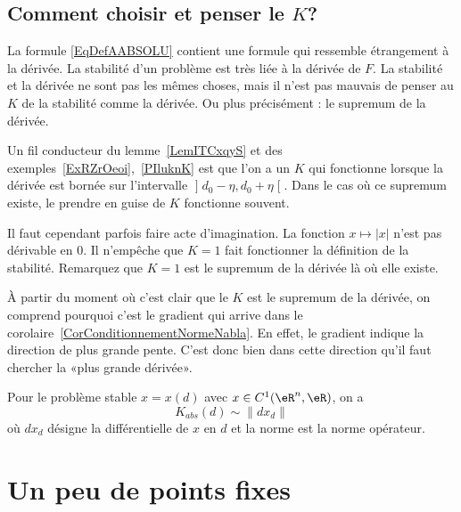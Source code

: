 \subsection{Comment choisir et penser le $K$?}

La formule \eqref{EqDefAABSOLU} contient une formule qui ressemble étrangement à la dérivée. La stabilité d'un problème est très liée à la dérivée de $F$. La stabilité et la dérivée ne sont pas les mêmes choses, mais il n'est pas mauvais de penser au $K$ de la stabilité comme la dérivée. Ou plus précisément : le supremum de la dérivée.

Un fil conducteur du lemme~\ref{LemITCxqyS} et des exemples~\ref{ExRZrOeoi},~\ref{PIluknK} est que l'on a un $K$ qui fonctionne lorsque la dérivée est bornée sur l'intervalle $\mathopen] d_0-\eta , d_0+\eta \mathclose[$. Dans le cas où ce supremum existe, le prendre en guise de $K$ fonctionne souvent.

Il faut cependant parfois faire acte d'imagination. La fonction $x\mapsto| x |$ n'est pas dérivable en $0$. Il n'empêche que $K=1$ fait fonctionner la définition de la stabilité. Remarquez que $K=1$ est le supremum de la dérivée là où elle existe.

À partir du moment où c'est clair que le $K$ est le supremum de la dérivée, on comprend pourquoi c'est le gradient qui arrive dans le corolaire~\ref{CorConditionnementNormeNabla}. En effet, le gradient indique la direction de plus grande pente. C'est donc bien dans cette direction qu'il faut chercher la «plus grande dérivée».

\begin{proposition}
	Pour le problème stable $x=x(d)$ avec $x\in C^1(\eR^n,\eR)$, on a
	\begin{equation}
		K_{abs}(d)\sim\| dx_d \|
	\end{equation}
	où \( dx_d\) désigne la différentielle de $x$ en $d$ et la norme est la norme opérateur.
\end{proposition}

\section{Un peu de points fixes}
\label{SECooWUVTooMhmvaW}

